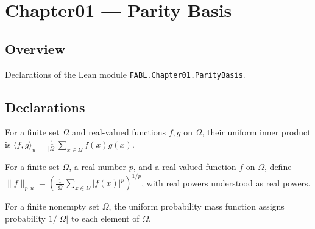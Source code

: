 \chapter{Chapter01 — Parity Basis}
\section{Overview}

Declarations of the Lean module \texttt{FABL.Chapter01.ParityBasis}.

\section{Declarations}

\begin{definition}
\label{FABL.uniformInner}
\leanok
For a finite set $\Omega$ and real-valued functions $f,g$ on $\Omega$, their uniform
inner product is $\langle f,g\rangle_u=\frac{1}{|\Omega|}\sum_{x\in\Omega}f(x)g(x)$.
\end{definition}

\begin{definition}
\label{FABL.uniformLpNorm}
\leanok
For a finite set $\Omega$, a real number $p$, and a real-valued function $f$ on
$\Omega$, define
$\|f\|_{p,u}=\left(\frac{1}{|\Omega|}\sum_{x\in\Omega}|f(x)|^p\right)^{1/p}$, with real
powers understood as real powers.
\end{definition}

\begin{definition}
\label{FABL.uniformPMF}
\leanok
For a finite nonempty set $\Omega$, the uniform probability mass function assigns
probability $1/|\Omega|$ to each element of $\Omega$.
\end{definition}

